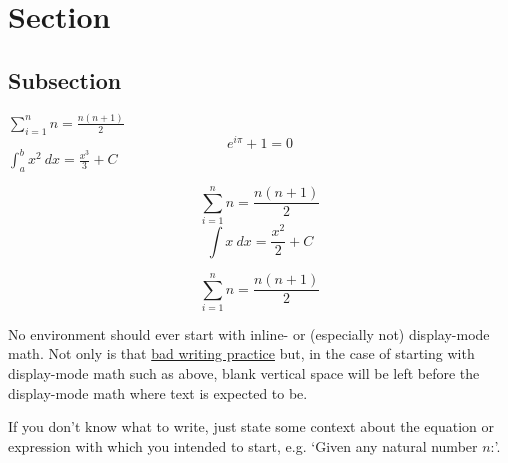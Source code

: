 \section{Section}

\lipsum[1-2]


\subsection{Subsection}

\lipsum[][1-9]

\begin{defn}
    \lipsum[][1] \(\sum_{i=1}^{n} n = \frac{n(n+1)}{2}\) \lipsum[][2-3]
    \[e^{i\pi}+1 = 0\]
    \lipsum[][4] \(\int_{a}^{b} x^2 \ dx = \frac{x^3}{3} + C\) \lipsum[][5-6]
\end{defn}

\begin{nota}
    \lipsum[][1-3]
    \[\sum_{i=1}^{n} n = \frac{n(n+1)}{2}\]
    \lipsum[][4-5]
    \[\int x \ dx = \frac{x^2}{2} + C\]
    \lipsum[][6-7]
\end{nota}

\begin{defn}
    \[\sum_{i=1}^{n} n = \frac{n(n+1)}{2}\]
    \lipsum[][3-5]
\end{defn}

\begin{rmrk}
    No environment should ever start with inline- or (especially not) display-mode math. Not only is that \href{https://kconrad.math.uconn.edu/blurbs/proofs/writingtips.pdf}{bad writing practice} but, in the case of starting with display-mode math such as above, blank vertical space will be left before the display-mode math where text is expected to be.

    If you don't know what to write, just state some context about the equation or expression with which you intended to start, e.g. `Given any natural number \(n\):'.
\end{rmrk}


